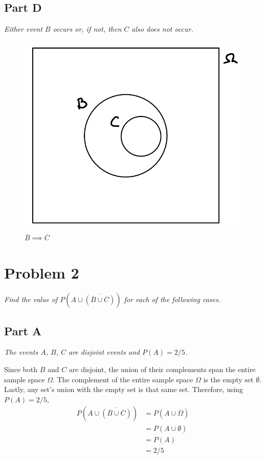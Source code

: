 \documentclass{article}
\begin{document}
\subsection*{Part D}

\textit{Either event $ B $ occurs or, if not, then $ C $ also does not occur.}

\begin{figure}[H]
    \centering
    \includegraphics[scale=0.5]{"P1D"}
    \caption{ $ \overline{B} \implies \overline{C} $ }
\end{figure}

\section*{Problem 2}

\textit{Find the value of $ P \left( A \cup \overline{ \left( \overline{B} \cup
\overline{C} \right) } \right) $ for each of the following cases.}

\subsection*{Part A}

\textit{The events $ A $, $ B $, $ C $ are disjoint events and $ P(A) = 2/5 $.}

\bigbreak

Since both $ B $ and $ C $ are disjoint, the union of their complements span the
entire sample space $ \Omega $. The complement of the entire sample space $
\Omega $ is the empty set $ \emptyset $. Lastly, any set's union with the empty
set is that same set. Therefore, using $ P(A) = 2/5 $,
\begin{align*}
    P \left( A \cup \overline{ \left( \overline{B} \cup \overline{C} \right) }
    \right) &= P \left( A \cup \overline{ \Omega } \right) \\
    &= P \left( A \cup \emptyset \right) \\
    &= P(A) \\
    &= 2/5
\end{align*}
\end{document}
